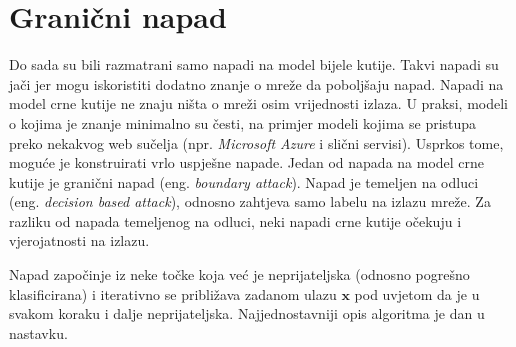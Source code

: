 \documentclass[utf8, diplomski]{fer}
\begin{document}
\section{Granični napad} Do sada su bili razmatrani samo napadi na model bijele kutije. Takvi napadi su jači jer mogu iskoristiti dodatno znanje o mreže da poboljšaju napad. Napadi na model crne kutije ne znaju ništa o mreži osim vrijednosti izlaza. U praksi, modeli o kojima je znanje minimalno su česti, na primjer modeli kojima se pristupa preko nekakvog web sučelja (npr. \textit{Microsoft Azure} i slični servisi). Usprkos tome, moguće je konstruirati vrlo uspješne napade.
Jedan od napada na model crne kutije je granični napad (eng. \textit{boundary attack}). Napad je temeljen na odluci (eng. \textit{decision based attack}), odnosno zahtjeva samo labelu na izlazu mreže. Za razliku od napada temeljenog na odluci, neki napadi crne kutije očekuju i vjerojatnosti na izlazu. \par
Napad započinje iz neke točke koja već je neprijateljska (odnosno pogrešno klasificirana) i iterativno se približava zadanom ulazu $\boldsymbol{x}$ pod uvjetom da je u svakom koraku i dalje neprijateljska. Najjednostavniji opis algoritma je dan u nastavku.
\end{document}
